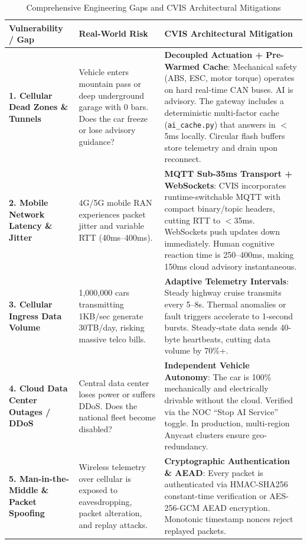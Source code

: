 \documentclass[12pt,a4paper]{report}
\begin{document}
\begin{table}[H]
\centering
\caption{Comprehensive Engineering Gaps and CVIS Architectural Mitigations}
\label{tab:gaps_mitigations}
\begin{tabularx}{\textwidth}{L{3.0cm} X X}
\toprule
\textbf{Vulnerability / Gap} & \textbf{Real-World Risk} & \textbf{CVIS Architectural Mitigation} \\
\midrule
\textbf{1. Cellular Dead Zones \& Tunnels} & Vehicle enters mountain pass or deep underground garage with 0 bars. Does the car freeze or lose advisory guidance? & \textbf{Decoupled Actuation + Pre-Warmed Cache}: Mechanical safety (ABS, ESC, motor torque) operates on hard real-time CAN buses. AI is advisory. The gateway includes a deterministic multi-factor cache (\texttt{ai\_cache.py}) that answers in $<$5ms locally. Circular flash buffers store telemetry and drain upon reconnect. \\
\midrule
\textbf{2. Mobile Network Latency \& Jitter} & 4G/5G mobile RAN experiences packet jitter and variable RTT (40ms--400ms). & \textbf{MQTT Sub-35ms Transport + WebSockets}: CVIS incorporates runtime-switchable MQTT with compact binary/topic headers, cutting RTT to $<$35ms. WebSockets push updates down immediately. Human cognitive reaction time is 250--400ms, making 150ms cloud advisory instantaneous. \\
\midrule
\textbf{3. Cellular Ingress Data Volume} & 1,000,000 cars transmitting 1KB/sec generate 30TB/day, risking massive telco bills. & \textbf{Adaptive Telemetry Intervals}: Steady highway cruise transmits every 5--8s. Thermal anomalies or fault triggers accelerate to 1-second bursts. Steady-state data sends 40-byte heartbeats, cutting data volume by 70\%+. \\
\midrule
\textbf{4. Cloud Data Center Outages / DDoS} & Central data center loses power or suffers DDoS. Does the national fleet become disabled? & \textbf{Independent Vehicle Autonomy}: The car is 100\% mechanically and electrically drivable without the cloud. Verified via the NOC ``Stop AI Service'' toggle. In production, multi-region Anycast clusters ensure geo-redundancy. \\
\midrule
\textbf{5. Man-in-the-Middle \& Packet Spoofing} & Wireless telemetry over cellular is exposed to eavesdropping, packet alteration, and replay attacks. & \textbf{Cryptographic Authentication \& AEAD}: Every packet is authenticated via HMAC-SHA256 constant-time verification or AES-256-GCM AEAD encryption. Monotonic timestamp nonces reject replayed packets. \\
\bottomrule
\end{tabularx}
\end{table}
\end{document}

